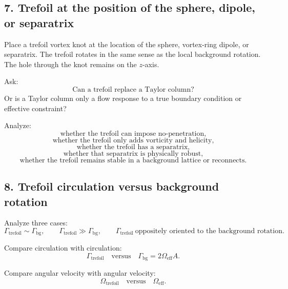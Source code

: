 \documentclass[11pt]{article}
\begin{document}
        \subsection{7. Trefoil at the position of the sphere, dipole, or separatrix}
            
            Place a trefoil vortex knot at the location of the sphere, vortex-ring dipole, or separatrix. The trefoil rotates in the same sense as the local background rotation. The hole through the knot remains on the \(z\)-axis.
            
            Ask:
            \[
                \text{Can a trefoil replace a Taylor column?}
            \]
            Or is a Taylor column only a flow response to a true boundary condition or effective constraint?
            
            Analyze:
            \[
                \text{whether the trefoil can impose no-penetration,}
            \]
            \[
                \text{whether the trefoil only adds vorticity and helicity,}
            \]
            \[
                \text{whether the trefoil has a separatrix,}
            \]
            \[
                \text{whether that separatrix is physically robust,}
            \]
            \[
                \text{whether the trefoil remains stable in a background lattice or reconnects.}
            \]
        
        \subsection{8. Trefoil circulation versus background rotation}
            
            Analyze three cases:
            \[
                \Gamma_{\mathrm{trefoil}}\sim\Gamma_{\mathrm{bg}},
                \qquad
                \Gamma_{\mathrm{trefoil}}\gg\Gamma_{\mathrm{bg}},
                \qquad
                \Gamma_{\mathrm{trefoil}}\ \text{oppositely oriented to the background rotation}.
            \]
            
            Compare circulation with circulation:
            \[
                \Gamma_{\mathrm{trefoil}}
                \quad\text{versus}\quad
                \Gamma_{\mathrm{bg}}=2\Omega_{\mathrm{eff}}A.
            \]
            
            Compare angular velocity with angular velocity:
            \[
                \Omega_{\mathrm{trefoil}}
                \quad\text{versus}\quad
                \Omega_{\mathrm{eff}}.
            \]
            
\end{document}
